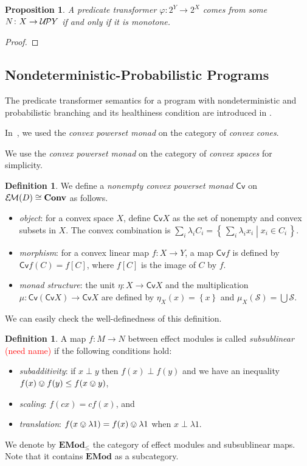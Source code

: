 \documentclass[9pt, preprint]{sigplanconf}
\theoremstyle{theorem}
\newtheorem{proposition}[theorem]{Proposition}
\theoremstyle{definition}
\newtheorem{definition}[theorem]{Definition}
\newcommand{\memo}[1]{\textcolor{red}{(#1)}}
\newcommand{\calS}{\mathcal{S}}
\renewcommand{\phi}{\varphi}
\newcommand{\set}[2]{\left\{\, #1 \mathrel{}\middle|\mathrel{} #2 \,\right\}}
\newcommand{\sett}[1]{\left\{ #1 \right\}}
\newcommand{\Conv}{\mathbf{Conv}}
\newcommand{\EM}{\mathcal{E}{\kern-.5ex}\mathcal{M}}
\newcommand{\EMod}{\mathbf{EMod}}
\newcommand{\UP}{\mathcal{U{\kern-.3ex}P}}
\newcommand{\RC}{\mathsf{Cv}}
\begin{document}
{\begin{proposition}
  A predicate transformer $\phi \colon 2^Y \to 2^X$ comes from
  some $N \colon X \to \UP Y$ if and only if it is monotone.
\end{proposition}
\begin{proof}

\end{proof}

\subsection{Nondeterministic-Probabilistic Programs}
\label{sub:nondet-prob}

The predicate transformer semantics for a program with nondeterministic
and probabilistic branching and its healthiness condition
are introduced in \cite{MorganMS96}.


In~\cite{Hasuo14, Hasuo15TCS}, we used the \emph{convex powerset monad}
on the category of \emph{convex cones}.

We use the \emph{convex powerset monad} on the category
of \emph{convex spaces} for simplicity.

\begin{definition}
  We define a \emph{nonempty convex powerset monad} $\RC$ on
  $\EM(D) \cong \Conv$ as follows.
  \begin{itemize}
    \item \emph{object}: for a convex space $X$,
      define $\RC X$ as the set of nonempty and convex subsets in $X$.
      The convex combination is
      $\sum_{i} \lambda_i C_i = \set{\sum_{i} \lambda_i x_i}{x_i \in C_i}$.
    \item \emph{morphism}: for a convex linear map $f \colon X \to Y$,
      a map $\RC f$ is defined by $\RC f (C) = f[C]$, where $f[C]$ is
      the image of $C$ by $f$.
    \item \emph{monad structure}: the unit $\eta \colon X \to \RC X$
    and the multiplication $\mu \colon \RC (\RC X) \to \RC X$ are defined by
    $\eta_X (x) = \sett{x}$ and $\mu_X (\calS) = \bigcup \calS$.
  \end{itemize}
  We can easily check the well-definedness of this definition.
\end{definition}

\begin{definition}
  A map $f \colon M \to N$ between effect modules is called \emph{subsublinear}
  \memo{need name} if the following conditions hold:
  \begin{itemize}
    \item \emph{subadditivity}: if $x \perp y$ then $f(x) \perp f(y)$ and
    we have an inequality $f(x) \ovee f(y) \leq f(x \ovee y)$,
    \item \emph{scaling}: $f(cx) = c f(x)$, and
    \item \emph{translation}: $f(x \ovee \lambda 1) = f(x) \ovee \lambda 1$
      when $x \perp \lambda 1$.
  \end{itemize}
  We denote by $\EMod_{\leq}$ the category of effect modules and
  subsublinear maps. Note that it contains $\EMod$ as a subcategory.
\end{definition}

}
\end{document}
